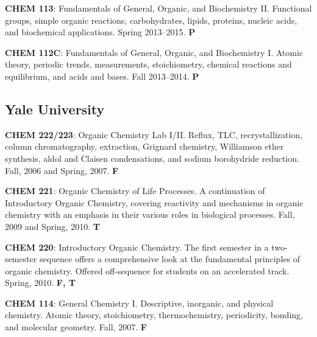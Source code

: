 \documentclass[11pt]{article}
\newcommand{\teitem}[4]{\textbf{#1}: #2 #3 \textbf{#4}}
\begin{document}
\teitem{CHEM 113}{Fundamentals of General, Organic, and Biochemistry II. Functional groups, simple organic reactions, carbohydrates, lipids, proteins, nucleic acids, and biochemical applications.}{Spring 2013--2015.}{P} 

\teitem{CHEM 112C}{Fundamentals of General, Organic, and Biochemistry I. Atomic theory, periodic trends, measurements, stoichiometry, chemical reactions and equilibrium, and acids and bases.}{Fall 2013--2014.}{P}


\subsection{Yale University}


\teitem{CHEM 222/223}{Organic Chemistry Lab I/II. Reflux, TLC, recrystallization, column chromatography, extraction, Grignard chemistry, Williamson ether synthesis, aldol and Claisen condensations, and sodium borohydride reduction.}{Fall, 2006 and Spring, 2007.}{F}

\teitem{CHEM 221}{Organic Chemistry of Life Processes. A continuation of  Introductory Organic Chemistry, covering reactivity and mechanisms in organic chemistry with an emphasis in their various roles in biological processes.}{Fall, 2009 and Spring, 2010.}{T}

\teitem{CHEM 220}{Introductory Organic Chemistry. The first semester in a two-semester sequence offers a comprehensive look at the fundamental principles of organic chemistry. Offered off-sequence for students on an accelerated track.}{Spring, 2010.}{F, T}

\teitem{CHEM 114}{General Chemistry I. Descriptive, inorganic, and physical chemistry. Atomic theory, stoichiometry, thermochemistry, periodicity, bonding, and molecular geometry.}{Fall, 2007.}{F}

\end{document}
